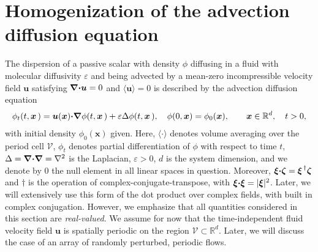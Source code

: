 \documentclass[english,12pt,jmp,graphicx]{revtex4-1}
\newcommand{\vecu}{\boldsymbol{u}}
\newcommand{\vecx}{\boldsymbol{x}}
\newcommand{\vecv}{\boldsymbol{v}}
\newcommand{\vecxi}{\boldsymbol{\xi}}
\newcommand{\veczeta}{\boldsymbol{\zeta}}
\newcommand{\vecz}{\boldsymbol{z}}
\newcommand{\bnabla}{\mbox{\boldmath${\nabla}$}}
\newcommand{\bcdot}{\mbox{\boldmath${\cdot}$}}
\newcommand{\Vc}{\mathcal{V}}
\renewcommand{\d}{\mathrm{d}}
\begin{document}
\section{Homogenization of the advection diffusion equation}
\label{sec:Homogenization}
%
The dispersion of a passive scalar with density $\phi$ diffusing in a
fluid with molecular diffusivity $\varepsilon$ and being advected by a 
mean-zero incompressible velocity field $\vecu$ satisfying
$\bnabla\bcdot\vecu=0$ and $\langle\vecu\rangle=0$ is described by the
advection diffusion equation         
%
\begin{align}\label{eq:ADE}
  \phi_t(t,\vecx\,)=\vecu(\vecx)\bcdot\bnabla \phi(t,\vecx\,)+\varepsilon\Delta\phi(t,\vecx\,),
  \quad
  \phi(0,\vecx)=\phi_0(\vecx),
  \qquad 
  \vecx\in\mathbb{R}^d,
  \quad t>0,
\end{align}
%
with initial density $\phi_0(\vecx)$ given. Here,
$\langle\cdot\rangle$ denotes volume averaging over the period cell 
$\Vc$, $\phi_t$ denotes partial
differentiation of $\phi$ with respect to time $t$,
$\Delta=\bnabla\bcdot\bnabla =\nabla^2$ is the Laplacian, $\varepsilon>0$, $d$ is
the system dimension, and we denote by $0$ the null element in all
linear spaces in question. Moreover,
$\vecxi\bcdot\veczeta=\vecxi^{\,\dagger}\veczeta$ and $\dagger$ is the operation
of complex-conjugate-transpose, with
$\vecxi\bcdot\vecxi=|\vecxi|^2$. Later, we will extensively use this
form of the dot product over complex fields, with built in complex
conjugation. However, we emphasize that 
all quantities considered in this section are \emph{real-valued}. We
assume for now that the time-independent fluid velocity field $\vecu$
is spatially periodic on the region $\Vc\subset\mathbb{R}^d$. Later, we will
discuss the case of an array of randomly perturbed, periodic flows.
%
%
%
\end{document}
